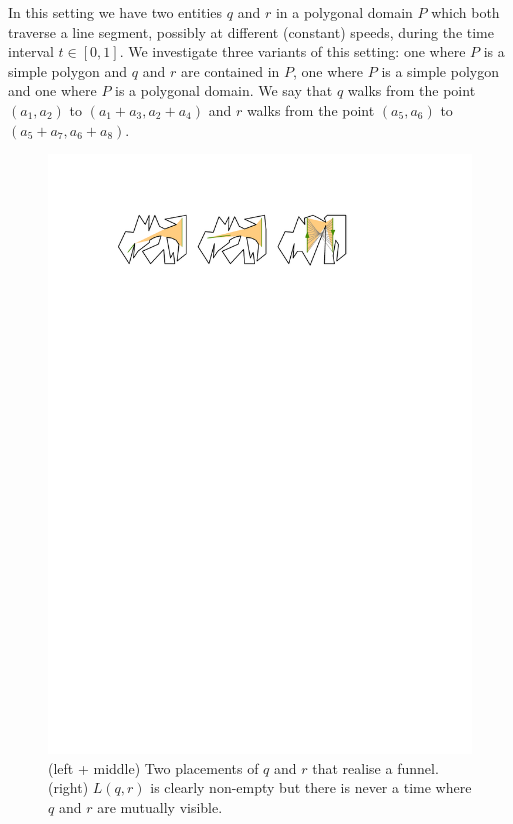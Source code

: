 \documentclass[UKenglish]{lipics-v2019}
\begin{document}
In this setting we have two entities $q$ and $r$ in a polygonal domain $P$ which both traverse a line segment, possibly at different (constant) speeds, during the time interval $t \in [0,1]$. We investigate three variants of this setting: one where $P$ is a simple polygon and $q$ and $r$ are contained in $P$, one where $P$ is a simple polygon and one where $P$ is a polygonal domain. We say that $q$ walks from the point $(a_1, a_2)$ to $(a_1 + a_3, a_2 + a_4)$ and $r$ walks from the point $(a_5, a_6)$ to $(a_5 + a_7, a_6 + a_8)$. 
\begin{figure}[t]
    \centering
    \includegraphics[]{../edgecase}
    \caption{(left + middle) Two placements of $q$ and $r$ that realise a funnel. (right) $L(q,r)$ is clearly non-empty but there is never a time where $q$ and $r$ are mutually visible. }
    \label{fig:edgecase}
\end{figure}
\end{document}
